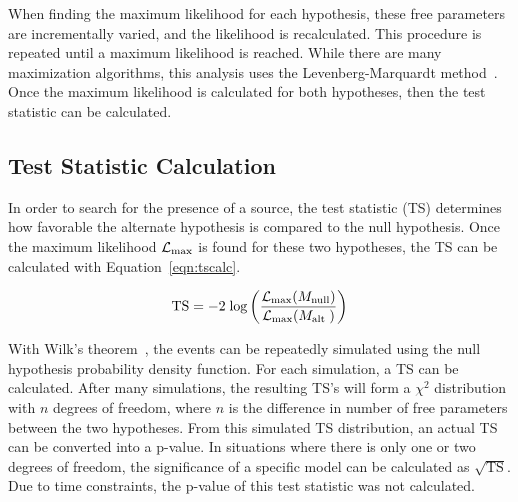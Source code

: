   When finding the maximum likelihood for each hypothesis, these free parameters are incrementally varied, and the likelihood is recalculated.
  This procedure is repeated until a maximum likelihood is reached.
  While there are many maximization algorithms, this analysis uses the Levenberg-Marquardt method~\cite{marquardt1963algorithm}.
  Once the maximum likelihood is calculated for both hypotheses, then the test statistic can be calculated.
  
  \subsection{Test Statistic Calculation}
  
  In order to search for the presence of a source, the test statistic (TS) determines how favorable the alternate hypothesis is compared to the null hypothesis.
  Once the maximum likelihood $\mathcal{L}_{\textrm{max}}$ is found for these two hypotheses, the TS can be calculated with Equation~\ref{eqn:tscalc}.
  
  \begin{equation}\label{eqn:tscalc}
    \textrm{TS} = - 2 \; \textrm{log} \left (  \frac{ \mathcal{L}_{\textrm{max}}( M_\textrm{null} ) }{ \mathcal{L}_{\textrm{max}}( M_\textrm{alt } ) } \right )
  \end{equation}
  
  With Wilk's theorem~\cite{wilks1938}, the events can be repeatedly simulated using the null hypothesis probability density function.
  For each simulation, a TS can be calculated.
  After many simulations, the resulting TS's will form a $\chi^2$ distribution with $n$ degrees of freedom, where $n$ is the difference in number of free parameters between the two hypotheses.
  From this simulated TS distribution, an actual TS can be converted into a p-value.
  In situations where there is only one or two degrees of freedom, the significance of a specific model can be calculated as $\sqrt{\textrm{TS}}$.
  Due to time constraints, the p-value of this test statistic was not calculated.
  

